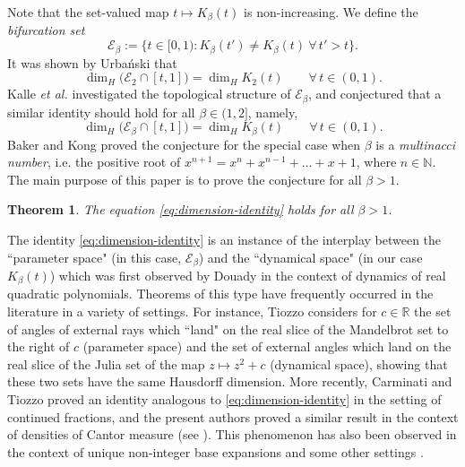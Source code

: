 \documentclass[11pt]{amsart}
\newtheorem{theorem}{Theorem}[section]
\theoremstyle{definition}
\theoremstyle{remark}
\numberwithin{equation}{section}
\newcommand{\R}{\ensuremath{\mathbb{R}}}
\newcommand{\N}{\ensuremath{\mathbb{N}}}
\newcommand{\EE}{\mathscr{E}}
\begin{document}
Note that the set-valued map $t\mapsto K_\beta(t)$ is non-increasing. We define the {\em bifurcation set}
\begin{equation} \label{eq:EE-beta}
\EE_\beta:=\{t\in[0,1): K_\beta(t')\neq K_\beta(t)\ \forall\,t'>t\}.
\end{equation}
It was shown by Urba\'{n}ski \cite{Urbanski-87} that
\begin{equation*}
\dim_H\big(\EE_2\cap[t,1]\big)=\dim_H K_2(t) \qquad \forall\,t\in(0,1).
\end{equation*}
Kalle {\em et al.} \cite{Kalle-Kong-Langeveld-Li-18} investigated the topological structure of $\EE_\beta$, and conjectured that a similar identity should hold for all $\beta\in(1,2]$, namely,
\begin{equation} \label{eq:dimension-identity}
\dim_H\big(\EE_\beta\cap[t,1]\big)=\dim_H K_\beta(t) \qquad \forall\,t\in(0,1).
\end{equation}
Baker and Kong \cite{Baker-Kong-2020} proved the conjecture for the special case when $\beta$ is a {\em multinacci number}, i.e. the positive root of $x^{n+1}=x^n+x^{n-1}+\dots+x+1$, where $n\in\N$. The main purpose of this paper is to prove the conjecture for all $\beta{>1}$.

\begin{theorem} \label{thm:main}
The equation \eqref{eq:dimension-identity} holds for all $\beta{>1}$.
\end{theorem}

The identity \eqref{eq:dimension-identity} is an instance of the interplay between the ``parameter space" (in this case, $\EE_\beta$) and the ``dynamical space" (in our case $K_\beta(t)$) which was first observed by Douady \cite{Douady-1995} in the context of dynamics of real quadratic polynomials. Theorems of this type have frequently occurred in the literature in a variety of settings. For instance, Tiozzo \cite{Tiozzo_2015} considers for $c\in\R$ the set of angles of external rays which ``land" on the real slice of the Mandelbrot set to the right of $c$ (parameter space) and the set of external angles which land on the real slice of the Julia set of the map $z\mapsto z^2+c$ (dynamical space), showing that these two sets have the same Hausdorff dimension. More recently, Carminati and Tiozzo \cite{CT-2021} proved an identity analogous to \eqref{eq:dimension-identity} in the setting of continued fractions, and the present authors proved a similar result in the context of densities of Cantor measure (see \cite{Allaart-Kong-2022}). {This phenomenon has also been observed in the context of unique non-integer base expansions and some other settings \cite{Huang-Kong-23, Jiang-Kong-Li-22, Kong-Li-Lv-Wang-Xu-20}.}
\end{document}
